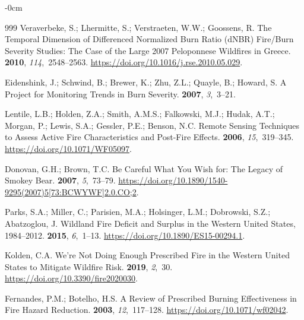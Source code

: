 \documentclass[fire,article,accept,oneauthor,pdftex]{Definitions/mdpi}
\begin{document}
\begin{adjustwidth}{-\extralength}{0cm}
\begin{thebibliography}{999}
Veraverbeke, S.; Lhermitte, S.; Verstraeten, W.W.; Goossens, R.
\newblock The Temporal Dimension of Differenced {{Normalized Burn Ratio}}
  ({{dNBR}}) Fire/Burn Severity Studies: {{The}} Case of the Large 2007
  {{Peloponnese}} Wildfires in {{Greece}}.
 {\bf 2010}, {\em
  114},~2548--2563.
\newblock
  \url{https://doi.org/10.1016/j.rse.2010.05.029}.

Eidenshink, J.; Schwind, B.; Brewer, K.; Zhu, Z.L.; Quayle, B.; Howard, S.
\newblock A Project for Monitoring Trends in Burn Severity.
 {\bf 2007}, {\em 3},~3--21.

Lentile, L.B.; Holden, Z.A.; Smith, A.M.S.; Falkowski, M.J.; Hudak, A.T.;
  Morgan, P.; Lewis, S.A.; Gessler, P.E.; Benson, N.C.
\newblock Remote Sensing Techniques to Assess Active Fire Characteristics and
  Post-Fire Effects.
 {\bf 2006}, {\em
  15},~319--345.
\newblock
  \url{https://doi.org/10.1071/WF05097}.

Donovan, G.H.; Brown, T.C.
\newblock Be Careful What You Wish for: The Legacy of {{Smokey Bear}}.
 {\bf 2007}, {\em
  5},~73--79.
\newblock
  \url{https://doi.org/10.1890/1540-9295(2007)5[73:BCWYWF]2.0.CO;2}.

Parks, S.A.; Miller, C.; Parisien, M.A.; Holsinger, L.M.; Dobrowski, S.Z.;
  Abatzoglou, J.
\newblock Wildland Fire Deficit and Surplus in the Western {{United States}},
  1984--2012.
 {\bf 2015}, {\em 6},~1--13.
\newblock
  \url{https://doi.org/10.1890/ES15-00294.1}.

Kolden, C.A.
\newblock We're {{Not Doing Enough Prescribed Fire}} in the {{Western United
  States}} to {{Mitigate Wildfire Risk}}.
 {\bf 2019}, {\em 2},~30.
\newblock
  \url{https://doi.org/10.3390/fire2020030}.

Fernandes, P.M.; Botelho, H.S.
\newblock A Review of Prescribed Burning Effectiveness in Fire Hazard
  Reduction.
 {\bf 2003}, {\em
  12},~117--128.
\newblock
  \url{https://doi.org/10.1071/wf02042}.


\end{thebibliography}
\end{adjustwidth}
\end{document}
